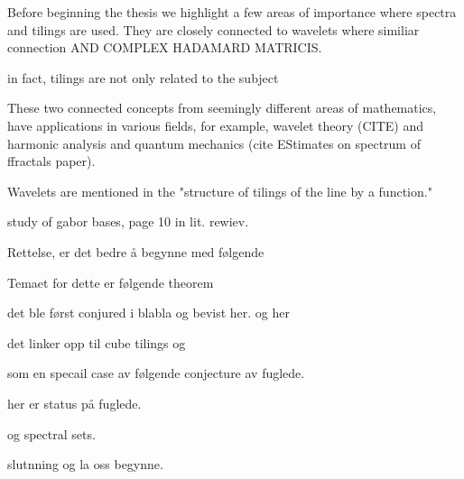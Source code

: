 \documentclass[../thesis.tex]{subfiles}
\begin{document}



Before beginning the thesis we highlight a few areas of importance where spectra and tilings are used. 
They are closely connected to wavelets where similiar connection AND COMPLEX HADAMARD MATRICIS. 

in fact, tilings are not only related to the subject 



These two connected concepts from seemingly different areas of mathematics, have applications in various fields, for example, wavelet theory (CITE) and harmonic analysis and quantum mechanics (cite EStimates on spectrum of ffractals paper).  


Wavelets are mentioned in the "structure of tilings of the line by a function."

study of gabor bases, page 10 in lit. rewiev. 

Rettelse, er det bedre å begynne med følgende

Temaet for dette er følgende theorem

det ble først conjured i blabla og bevist her. og her 


det linker opp til cube tilings og 


som en specail case av følgende conjecture av fuglede.

her er status på fuglede. 

og spectral sets. 


slutnning og la oss begynne. 
\end{document}
